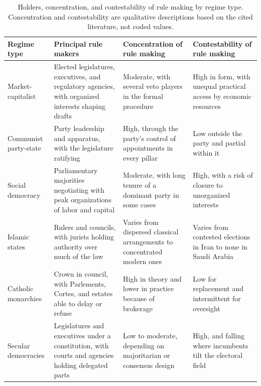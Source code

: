 \documentclass[11pt,letterpaper]{article}
\theoremstyle{definition}
\theoremstyle{remark}
\begin{document}
\begin{table}[tbp]
\centering
\small
\caption{Holders, concentration, and contestability of rule making by regime type. Concentration and contestability are qualitative descriptions based on the cited literature, not coded values.}
\label{tab:regimes-holders}
\begin{tabularx}{\textwidth}{@{}L{2.5cm}YYY@{}}
\toprule
Regime type & Principal rule makers & Concentration of rule making & Contestability of rule making \\
\midrule
Market-capitalist & Elected legislatures, executives, and regulatory agencies, with organized interests shaping drafts & Moderate, with several veto players in the formal procedure & High in form, with unequal practical access by economic resources \\
Communist party-state & Party leadership and apparatus, with the legislature ratifying & High, through the party's control of appointments in every pillar & Low outside the party and partial within it \\
Social democracy & Parliamentary majorities negotiating with peak organizations of labor and capital & Moderate, with long tenure of a dominant party in some cases & High, with a risk of closure to unorganized interests \\
Islamic states & Rulers and councils, with jurists holding authority over much of the law & Varies from dispersed classical arrangements to concentrated modern ones & Varies from contested elections in Iran to none in Saudi Arabia \\
Catholic monarchies & Crown in council, with Parlements, Cortes, and estates able to delay or refuse & High in theory and lower in practice because of brokerage & Low for replacement and intermittent for oversight \\
Secular democracies & Legislatures and executives under a constitution, with courts and agencies holding delegated parts & Low to moderate, depending on majoritarian or consensus design & High, and falling where incumbents tilt the electoral field \\
\bottomrule
\end{tabularx}
\end{table}
\end{document}
